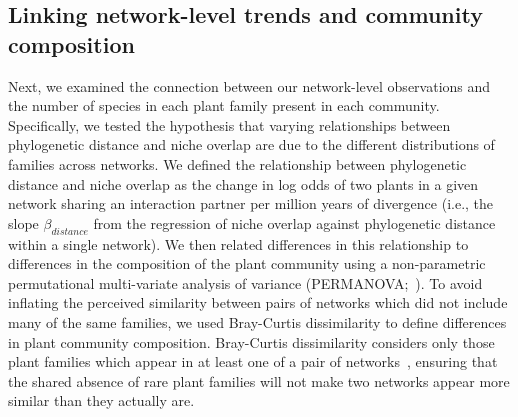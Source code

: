 \documentclass[12pt]{article}
\begin{document}
\begin{spacing}{1.5}


  \subsection*{Linking network-level trends and community composition}

    Next, we examined the connection between our network-level observations
    and the number of species in each plant family present in each community.
    Specifically, we tested the hypothesis that
    varying relationships between phylogenetic distance and
    niche overlap are due to the different distributions 
    of families across networks. We defined the relationship between
    phylogenetic distance and niche overlap as the change in 
    log odds of two plants in a given network sharing an interaction 
    partner per million years of divergence (i.e., the slope $\beta_{distance}$ from the 
    regression of niche overlap against phylogenetic distance within
    a single network). We then related differences in this relationship
    to differences in the composition of the plant community 
    using a non-parametric permutational multi-variate 
    analysis of variance (PERMANOVA;~\citealp{Anderson2001}).
    To avoid inflating the perceived similarity between
    pairs of networks which did not include many of the same families,
    we used Bray-Curtis dissimilarity to define differences in plant
    community composition. Bray-Curtis dissimilarity considers only
    those plant families which appear in at least one of a pair of
    networks~\citep{Anderson2001,Cirtwill2015}, ensuring that the
    shared absence of rare plant families will not make 
    two networks appear more similar than they actually are. 



\end{spacing}
\end{document}
